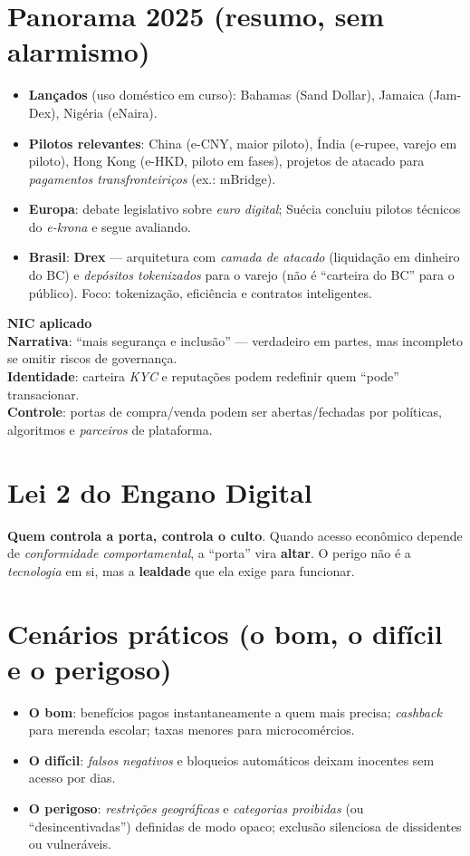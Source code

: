 \section{Panorama 2025 (resumo, sem alarmismo)}
\begin{itemize}[leftmargin=*,noitemsep]
  \item \textbf{Lançados} (uso doméstico em curso): Bahamas (Sand Dollar), Jamaica (Jam-Dex), Nigéria (eNaira).
  \item \textbf{Pilotos relevantes}: China (e-CNY, maior piloto), Índia (e-rupee, varejo em piloto), Hong Kong (e-HKD, piloto em fases), projetos de atacado para \emph{pagamentos transfronteiriços} (ex.: mBridge). 
  \item \textbf{Europa}: debate legislativo sobre \emph{euro digital}; Suécia concluiu pilotos técnicos do \emph{e-krona} e segue avaliando.
  \item \textbf{Brasil}: \textbf{Drex} --- arquitetura com \emph{camada de atacado} (liquidação em dinheiro do BC) e \emph{depósitos tokenizados} para o varejo (não é ``carteira do BC'' para o público). Foco: tokenização, eficiência e contratos inteligentes.
\end{itemize}

\begin{nicbox}
\textbf{NIC aplicado}\\
\textbf{Narrativa}: ``mais segurança e inclusão'' --- verdadeiro em partes, mas incompleto se omitir riscos de governança.\\
\textbf{Identidade}: carteira \emph{KYC} e reputações podem redefinir quem ``pode'' transacionar.\\
\textbf{Controle}: portas de compra/venda podem ser abertas/fechadas por políticas, algoritmos e \emph{parceiros} de plataforma.
\end{nicbox}

\section{Lei 2 do Engano Digital}
\textbf{Quem controla a porta, controla o culto}. Quando acesso econômico depende de \emph{conformidade comportamental}, a “porta” vira \textbf{altar}. O perigo não é a \emph{tecnologia} em si, mas a \textbf{lealdade} que ela exige para funcionar.

\section{Cenários práticos (o bom, o difícil e o perigoso)}
\begin{itemize}[leftmargin=*,noitemsep]
  \item \textbf{O bom}: benefícios pagos instantaneamente a quem mais precisa; \emph{cashback} para merenda escolar; taxas menores para microcomércios.
  \item \textbf{O difícil}: \emph{falsos negativos} e bloqueios automáticos deixam inocentes sem acesso por dias.
  \item \textbf{O perigoso}: \emph{restrições geográficas} e \emph{categorias proibidas} (ou “desincentivadas”) definidas de modo opaco; exclusão silenciosa de dissidentes ou vulneráveis.
\end{itemize}

